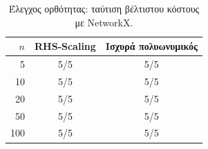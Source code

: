\begin{table}[h]
\centering
\caption{Έλεγχος ορθότητας: ταύτιση βέλτιστου κόστους με \textenglish{NetworkX}.}
\label{tab:correctness}
\begin{tabular}{rcc}
\toprule
$n$ & \textenglish{RHS-Scaling} & Ισχυρά πολυωνυμικός \\
\midrule
  5 & 5/5 & 5/5 \\
  10 & 5/5 & 5/5 \\
  20 & 5/5 & 5/5 \\
  50 & 5/5 & 5/5 \\
  100 & 5/5 & 5/5 \\
\bottomrule
\end{tabular}
\end{table}

